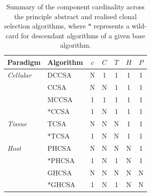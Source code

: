 \begin{table}[htp]
	\centering\small
		\begin{tabular}{llccccc}
		\toprule
		\textbf{Paradigm} & \textbf{Algorithm} & \textbf{$c$} & \textbf{$C$} & \textbf{$T$} & \textbf{$H$} & \textbf{$P$} \\ 
		\toprule
		\emph{Cellular} & DCCSA				& N & 1 & 1 & 1 & 1 \\ 										
					 				  & CCSA 				& N & N & 1 & 1 & 1 \\ 
					 				  & MCCSA				& 1 & 1 & 1 & 1 & 1 \\ 
					 				  & $\ast$CCSA	& 1 & N & 1 & 1 & 1 \\ 
		\midrule
		\emph{Tissue} & TCSA 			 		& N & N & N & 1 & 1 \\ 
		 			 				& $\ast$TCSA 		& 1 & N & N & 1 & 1 \\
		\midrule
		\emph{Host} 	& PHCSA					& N & N & N & N & 1 \\ 
									& $\ast$PHCSA		& 1 & N & 1 & N & 1 \\ 
									& GHCSA					& N & N & N & N & N \\ 
									& $\ast$GHCSA		& 1 & N & 1 & N & N \\
		\bottomrule
		\end{tabular}
	\caption{Summary of the component cardinality across the principle abstract and realised clonal selection algorithms, where $\ast$ represents a wild-card for descendant algorithms of a given base algorithm.}
	\label{tab:framework:hcsf:cardinality}
\end{table}

